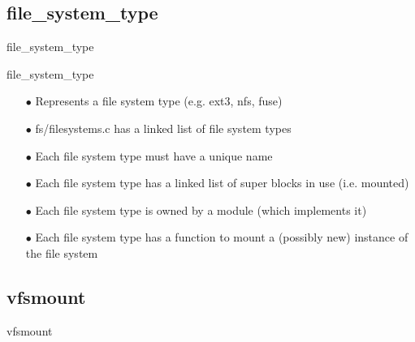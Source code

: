 \documentclass{beamer}
\begin{document}
\subsection{file\_system\_type}

\begin{frame}{file\_system\_type}
	
	
\end{frame}

\begin{frame}{file\_system\_type}
	
	\begin{itemize}[<+->]
	
		\item[$\bullet$]{Represents a file system type (e.g. ext3, nfs, fuse)}
		\item[$\bullet$]{fs/filesystems.c has a linked list of file system types}
		\item[$\bullet$]{Each file system type must have a unique name}
		\item[$\bullet$]{Each file system type has a linked list of super blocks in use (i.e. mounted)}		
		\item[$\bullet$]{Each file system type is owned by a module (which implements it)}
		\item[$\bullet$]{Each file system type has a function to mount a (possibly new) instance of the file system}
		
	\end{itemize}

\end{frame}

\subsection{vfsmount}
	
\begin{frame}{vfsmount}
	
	
\end{frame}
\end{document}
